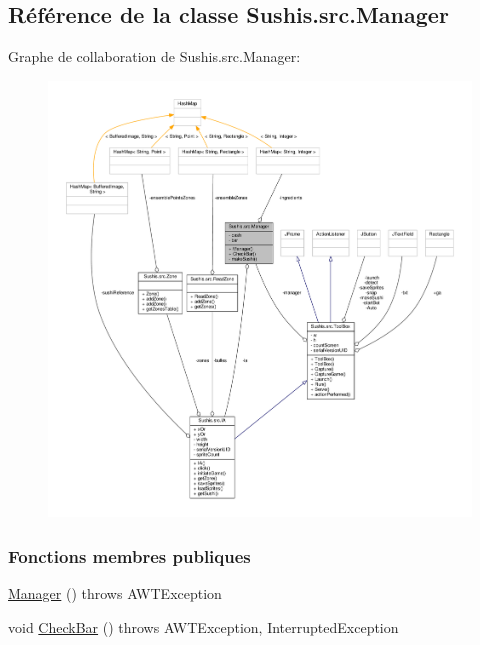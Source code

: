 \hypertarget{classSushis_1_1src_1_1Manager}{}\subsection{Référence de la classe Sushis.\+src.\+Manager}
\label{classSushis_1_1src_1_1Manager}


Graphe de collaboration de Sushis.\+src.\+Manager\+:\nopagebreak
\begin{figure}[H]
\begin{center}
\leavevmode
\includegraphics[width=350pt]{classSushis_1_1src_1_1Manager__coll__graph}
\end{center}
\end{figure}
\subsubsection*{Fonctions membres publiques}
\begin{DoxyCompactItemize}
\item 
\hyperlink{classSushis_1_1src_1_1Manager_ad3c6eb65a2468a2afde378e5e4635aea}{Manager} ()  throws A\+W\+T\+Exception 
\item 
void \hyperlink{classSushis_1_1src_1_1Manager_a76009c42816f2888b98c4d051dda02c9}{Check\+Bar} ()  throws A\+W\+T\+Exception, Interrupted\+Exception 
\end{DoxyCompactItemize}

